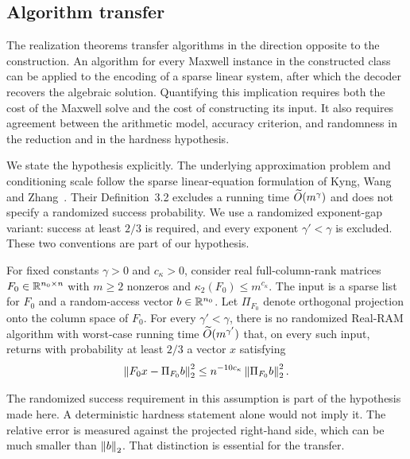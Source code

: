 \subsection{Algorithm transfer}\label{si:sec:transfer-statements}

The realization theorems transfer algorithms in the direction opposite
to the construction. An algorithm for every Maxwell instance in the
constructed class can be applied to the encoding of a sparse linear system, after which
the decoder recovers the algebraic solution. Quantifying this implication
requires both the cost of the Maxwell solve and the cost of constructing
its input. It also requires agreement between the arithmetic model,
accuracy criterion, and randomness in the reduction and in the hardness
hypothesis.

We state the hypothesis explicitly. The underlying approximation problem and
conditioning scale follow the sparse linear-equation formulation of Kyng,
Wang and Zhang~\cite{kyng2020}. Their Definition~3.2 excludes a running time
$\widetilde O(m^\gamma)$ and does not specify a randomized success probability.
We use a randomized exponent-gap variant: success at least $2/3$ is required,
and every exponent $\gamma'<\gamma$ is excluded.
These two conventions are part of our hypothesis.

\begin{assumption}
\label{d:ass:slth}
For fixed constants $\gamma>0$ and $c_\kappa>0$, consider real full-column-rank
matrices $F_0\in\mathbb R^{n_0\times n}$ with $m\ge2$ nonzeros and
$\kappa_2(F_0)\le m^{c_\kappa}$. The input is a sparse list for $F_0$ and a
random-access vector $b\in\mathbb R^{n_0}$. Let $\Pi_{F_0}$ denote orthogonal
projection onto the column space of $F_0$. For every $\gamma'<\gamma$,
there is no randomized Real-RAM algorithm with worst-case running time
$\widetilde O(m^{\gamma'})$ that, on every such input, returns with
probability at least $2/3$ a vector $x$ satisfying
\begin{equation}
 \left\lVert F_0x-\Pi_{F_0}b\right\rVert_2^2
 \le n^{-10c_\kappa}\left\lVert \Pi_{F_0}b\right\rVert_2^2.
 \label{d:eq:slth-target}
\end{equation}
\end{assumption}

The randomized success requirement in this assumption is part of the
hypothesis made here. A deterministic hardness statement alone would not
imply it. The relative error is measured against the projected right-hand
side, which can be much smaller than $\left\lVert b\right\rVert_2$. That distinction is
essential for the transfer.

